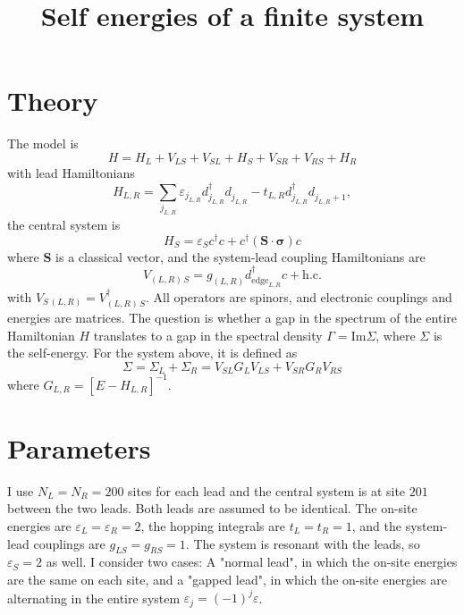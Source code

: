 \documentclass{article}
\renewcommand{\vec}[1]{\mathbf{#1}}
\newcommand{\pdagger}{{\phantom{\dagger}}}
\begin{document}
\title{Self energies of a finite system}
\author{}
\maketitle
\section{Theory}
The model is 
\begin{equation}
	H = H_L + V_{LS} + V_{SL} + H_S + V_{SR} + V_{RS} + H_R
\end{equation}
with lead Hamiltonians
\begin{equation}
	H_{L,R} = \sum_{j_{L,R}} \varepsilon_{j_{L,R}} d_{j_{L,R}}^\dagger d_{j_{L,R}}^\pdagger -t_{L,R} d_{j_{L,R}}^\dagger d_{j_{L,R}+1}^\pdagger,
\end{equation}
the central system is 
\begin{equation}
	H_S = \varepsilon_S c^\dagger c + c^\dagger (\vec{S}\cdot\bm{\sigma}) c
\end{equation}
where $\vec{S}$ is a classical vector, and the system-lead coupling Hamiltonians are
\begin{equation}
	V_{(L,R) \, S} = g_{(L,R)} d_{\mathrm{edge}_{L,R}}^\dagger c + \mathrm{h.c.}  
\end{equation}
with $V_{S \, (L,R)} =V_{(L,R) \, S}^\dagger$. All operators are spinors, and electronic couplings and energies are matrices. The question is whether a gap in the spectrum of the entire Hamiltonian $H$ translates to a gap in the spectral density $\Gamma = \mathrm{Im} \Sigma$, where $\Sigma$ is the self-energy. For the system above, it is defined as 
\begin{equation}
	\Sigma = \Sigma_L + \Sigma_R = V_{SL} G_L V_{LS} + V_{SR} G_R V_{RS}\label{eq:self_energy}
\end{equation}
where $G_{L,R}=[E-H_{L,R}]^{-1}$.
\section{Parameters} 
I use $N_L = N_R = 200$ sites for each lead and the central system is at site $201$ between the two leads. Both leads are assumed to be identical. The on-site energies are $\varepsilon_{L}=\varepsilon_{R} = 2$, the hopping integrals are $t_L=t_R = 1$, and the system-lead couplings are $g_{LS}=g_{RS} = 1$. The system is resonant with the leads, so $\varepsilon_S = 2$ as well. I consider two cases: A "normal lead", in which the on-site energies are the same on each site, and a "gapped lead", in which the on-site energies are alternating in the entire system $\varepsilon_j = (-1)^j \varepsilon$. 
\clearpage
\end{document}
